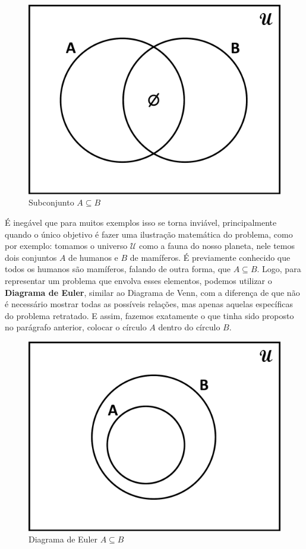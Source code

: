 \begin{figure}[h!]
  \centering
  \includegraphics[scale=0.3]{figures/sets/fig_sets_03_08.pdf}
  \caption{Subconjunto $A \subseteq B$}
  \label{fig:sets_03_08}
\end{figure}

É inegável que para muitos exemplos isso se torna inviável, principalmente quando o único objetivo é fazer uma ilustração matemática do problema, como por exemplo: tomamos o universo $\mathcal U$ como a fauna do nosso planeta, nele temos dois conjuntos $A$ de humanos e $B$ de mamíferos. É previamente conhecido que todos os humanos são mamíferos, falando de outra forma, que $A \subseteq B$. Logo, para representar um problema que envolva esses elementos, podemos utilizar o \textbf{Diagrama de Euler}, similar ao Diagrama de Venn, com a diferença de que não é necessário mostrar todas as possíveis relações, mas apenas aquelas específicas do problema retratado. E assim, fazemos exatamente o que tinha sido proposto no parágrafo anterior, colocar o círculo $A$ dentro do círculo $B$.

\begin{figure}[h!]
  \centering
  \includegraphics[scale=0.3]{figures/sets/fig_sets_03_09.pdf}
  \caption{Diagrama de Euler $A \subseteq B$}
  \label{fig:sets_03_09}
\end{figure}

